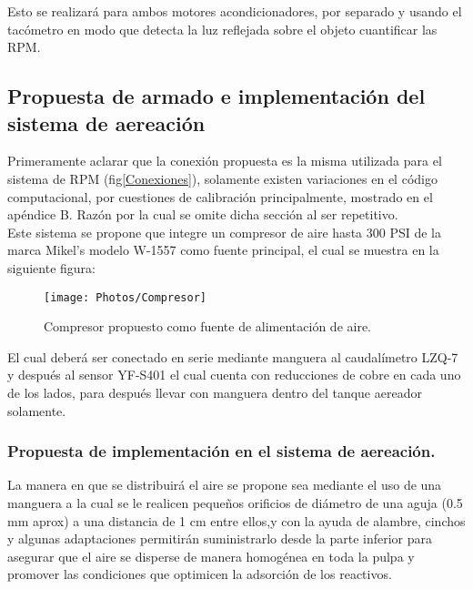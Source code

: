 \documentclass[11pt,letter
								]
								{article}
\begin{document}
Esto se realizará  para ambos motores acondicionadores,  por separado y usando el tacómetro en modo que detecta la luz reflejada sobre el objeto cuantificar las RPM.\\






\subsection[Propuesta de armado e implementación del  sistema \\de aereación  ]
{Propuesta de armado e implementación del  sistema de aereación   }

Primeramente aclarar que la conexión  propuesta es la misma utilizada para el sistema de RPM (fig\ref{Conexiones}), solamente existen variaciones en el código computacional, por cuestiones de calibración principalmente, mostrado en el apéndice B. Razón por la cual se omite dicha sección al ser repetitivo. \\

		Este sistema se propone que integre  un compresor de aire hasta 300 PSI de la marca Mikel's modelo W-1557  como fuente principal, el cual se muestra en la siguiente figura:


\begin{figure}[H]
\centering
\texttt{[image: Photos/Compresor]}
\caption{Compresor propuesto como fuente de alimentación de aire. \cite{w1557} }
\label{Compresor}
\end{figure}

El cual deberá ser  conectado en serie  mediante manguera   al caudalímetro LZQ-7 y después al sensor  YF-S401  el cual cuenta con reducciones de cobre en cada uno de los lados, para después llevar con  manguera dentro del tanque aereador solamente. \\

		
	
	\subsubsection{Propuesta de implementación en el sistema de aereación.  }
	

	La manera en que se distribuirá el  aire se propone sea mediante el uso de una manguera a la cual se le realicen   pequeños orificios  de diámetro de una aguja (0.5 mm aprox) a una distancia de 1 cm entre ellos,y con la ayuda de alambre, cinchos y algunas adaptaciones   permitirán suministrarlo desde la parte inferior para asegurar que el aire se disperse  de manera homogénea en toda la pulpa y promover las condiciones que optimicen la adsorción de los reactivos. \\
\end{document}
